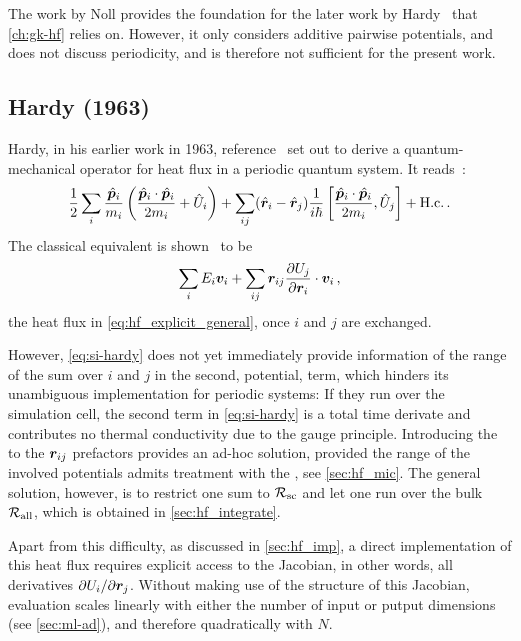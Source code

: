 The work by Noll provides the foundation for the later work by Hardy~\cite{h1982t} that \cref{ch:gk-hf} relies on. However, it only considers additive pairwise potentials, and does not discuss periodicity, and is therefore not sufficient for the present work.

\subsection{Hardy (1963)}

Hardy, in his earlier work in 1963, reference~\cite{h1963t} set out to derive a quantum-mechanical operator for heat flux in a periodic quantum system.
It reads~\cite[eq.~2.14]{h1963t}:
\begin{equation}
	\frac{1}{2} \sum_i \frac{\hat{\boldsymbol{p}}_i}{m_i} \left(\frac{\hat{\boldsymbol{p}}_i\cdot\hat{\boldsymbol{p}}_i}{2 m_i} + \hat U_i \right) + \sum_{ij} (\hat{\boldsymbol{r}}_i - \hat{\boldsymbol{r}}_j) \frac{1}{i \hbar} \left[\frac{\hat{\boldsymbol{p}}_i\cdot\hat{\boldsymbol{p}}_i}{2 m_i}, \hat U_j \right] + \text{H.c.} \,.
\end{equation}
The classical equivalent is shown~\cite{fpdh2015t} to be
\begin{equation}
	\sum_i E_i \V_i + \sum_{ij} \R_{ij} \dur{j}{i}{} \cdot \V_i \,, \label{eq:si-hardy}
\end{equation}
the  heat flux in \cref{eq:hf_explicit_general}, once $i$ and $j$ are exchanged.

However, \cref{eq:si-hardy} does not yet immediately provide information of the range of the sum over $i$ and $j$ in the second, potential, term, which hinders its unambiguous implementation for periodic systems: If they run over the simulation cell, the second term in \cref{eq:si-hardy} is a total time derivate and contributes no thermal conductivity due to the gauge principle. Introducing the \mic to the $\boldsymbol{r}_{ij}$ prefactors provides an ad-hoc solution, provided the range of the involved potentials admits treatment with the \mic, see \cref{sec:hf_mic}. The general solution, however, is to restrict one sum to $\mathcal{R_{\text{sc}}}$ and let one run over the bulk $\mathcal{R_{\text{all}}}$, which is obtained in \cref{sec:hf_integrate}.

Apart from this difficulty, as discussed in \cref{sec:hf_imp}, a direct implementation of this heat flux requires explicit access to the Jacobian, in other words, all derivatives $\partial U_{i} / \partial \boldsymbol{r}_{j}$. Without making use of the structure of this Jacobian, evaluation scales linearly with either the number of input or putput dimensions (see \cref{sec:ml-ad}), and therefore quadratically with $N$.

